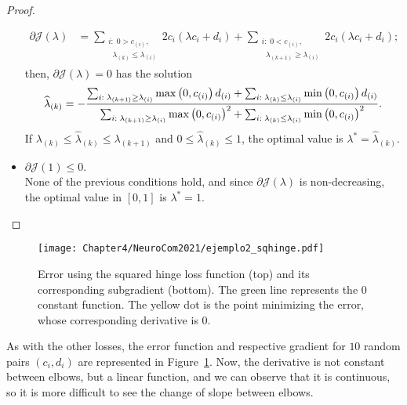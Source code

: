\begin{proof}
\begin{itemize}
\begin{equation}
\begin{aligned}
                \partial \mathcal{J}(\lambda) &=  \sum_{\substack{i:\; 0 > c_{(i)},\\ \;\; \lambda_{(k)} \leq \lambda_{(i)}}} {2 c_i (\lambda c_i + d_i)} + \sum_{\substack{i:\; 0 < c_{(i)},\\ \;\; \lambda_{(k+1)} \geq \lambda_{(i)}}} {2 c_i (\lambda c_i + d_i)}  ;
            \end{aligned}        
        \end{equation}
        then, $\partial \mathcal{J}(\lambda) = 0$ has the solution
        \begin{equation}
            \nonumber
            \widehat{\lambda}_{(k)} = - \frac{\sum_{i:\; \lambda_{(k+1)} \geq \lambda_{(i)}} \max\left(0, c_{(i)}\right) d_{(i)} + \sum_{i:\; \lambda_{(k)} \leq \lambda_{(i)}} \min\left(0, c_{(i)}\right) d_{(i)}}{\sum_{i:\; \lambda_{(k+1)} \geq \lambda_{(i)}} \max\left(0, c_{(i)}\right)^2 + \sum_{i:\; \lambda_{(k)} \leq \lambda_{(i)}} \min\left(0, c_{(i)}\right)^2} .
        \end{equation}
        If $\lambda_{(k)} \leq \widehat{\lambda}_{(k)} \leq \lambda_{(k+1)}$ and $0 \leq \widehat{\lambda}_{(k)} \leq 1$, the optimal value is $\lambda^* = \widehat{\lambda}_{(k)}$.
        \item $\partial \mathcal{J}(1) \leq 0$. 
        \\None of the previous conditions hold, and since $\partial \mathcal{J}(\lambda)$ is non-decreasing, the optimal value in $[0, 1]$ is $\lambda^* = 1$.
    \end{itemize}
\end{proof}


\begin{figure}[t!]
    \centering
    \texttt{[image: Chapter4/NeuroCom2021/ejemplo2\_sqhinge.pdf]}
    \caption{Error using the squared hinge loss function (top) and its corresponding subgradient (bottom). The green line represents the $0$ constant function. The yellow dot is the point minimizing the error, whose corresponding derivative is $0$.}
    \label{fig:sqhinge_error}
\end{figure}

As with the other losses, the error function and respective gradient for $10$ random pairs $(c_i, d_i)$ are represented in Figure~\ref{fig:sqhinge_error}.
Now, the derivative is not constant between elbows, but a linear function, and we can observe that it is continuous, so it is more difficult to see the change of slope between elbows. 

